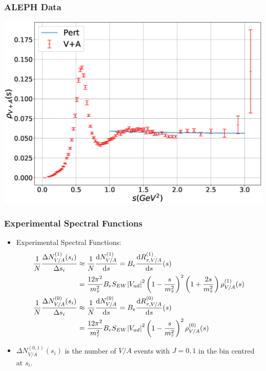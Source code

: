 \documentclass{beamer}
\begin{document}
\begin{frame}
  \frametitle{ALEPH Data}
  \includegraphics[width=.9\textwidth]{./images/specFuncAleph_VpA.eps}
\end{frame}

\begin{frame}
  \frametitle{Experimental Spectral Functions}
  \begin{itemize}
    \item Experimental Spectral Functions:
      \begin{align}
        \frac{1}{N} \frac{\Delta N_{V/A}^{(1)}(s_i)}{\Delta s_i}
        &\approx \frac{1}{N} \frac{\dif N_{V/A}^{(1)}}{\dif s} = B_e \frac{\dif R_{\tau, V/A}^{(1)}}{\dif s}(s) \nonumber\\
        &= \frac{12\pi^2}{m_\tau^2} B_e S_{EW} \abs{V_{ud}}^2
          \left( 1 - \frac{s}{m_\tau^2} \right)^2\left( 1 + \frac{2s}{m_\tau^2} \right) \rho_{V/A}^{(1)}(s) \\
        \frac{1}{N} \frac{\Delta N_{V/A}^{(0)}(s_i)}{\Delta s_i}
        &\approx \frac{1}{N} \frac{\dif N_{V/A}^{(0)}}{\dif s} = B_e \frac{\dif R_{\tau, V/A}^{(0)}}{\dif s}(s) \nonumber\\
        &= \frac{12\pi^2}{m_\tau^2} B_e S_{EW} \abs{V_{ud}}^2
          \left( 1 - \frac{s}{m_\tau^2} \right)^2 \rho_{V/A}^{(0)}(s)
      \end{align}
    \item \(\Delta N_{V/A}^{(0,1)}(s_i)\) is the number of \(V/A\) events with
      \(J=0,1\) in the bin centred at \(s_i\).
  \end{itemize}
\end{frame}
\end{document}

